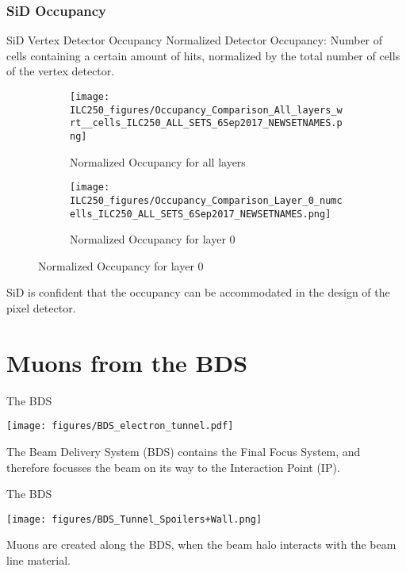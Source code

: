 \documentclass[xcolor={dvipsnames}]{beamer}
\begin{document}
\subsubsection{SiD Occupancy}
\begin{frame}{SiD Vertex Detector Occupancy}
 Normalized Detector Occupancy: Number of cells containing a certain amount of hits, normalized by the total number of cells of the vertex detector.
 \begin{figure}
\centering
\begin{subfigure}[t]{0.48\textwidth}
\centering
\texttt{[image: ILC250\_figures/Occupancy\_Comparison\_All\_layers\_wrt\_\_cells\_ILC250\_ALL\_SETS\_6Sep2017\_NEWSETNAMES.png]}
\caption{\alert{Normalized Occupancy for all layers}}
\end{subfigure}
\hspace*{0.2cm}
\begin{subfigure}[t]{0.48\textwidth}
\centering
\texttt{[image: ILC250\_figures/Occupancy\_Comparison\_Layer\_0\_numcells\_ILC250\_ALL\_SETS\_6Sep2017\_NEWSETNAMES.png]}
\caption{\alert{Normalized Occupancy for layer 0}}
\end{subfigure}
\end{figure}
SiD is confident that the occupancy can be accommodated in the design of the pixel detector.
\end{frame}

\section{Muons from the BDS}

\begin{frame}{The BDS}
\begin{center}
  \texttt{[image: figures/BDS\_electron\_tunnel.pdf]}
  \end{center}
The Beam Delivery System (BDS) contains the Final Focus System, and therefore focusses the beam on its way to the Interaction Point (IP).
\end{frame}
  \begin{frame}{The BDS}
\begin{center}
  \texttt{[image: figures/BDS\_Tunnel\_Spoilers+Wall.png]}
\end{center}
Muons are created along the BDS, when the beam halo interacts with the beam line material.
\end{frame}
\end{document}
